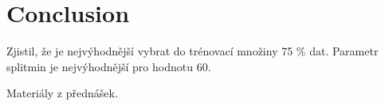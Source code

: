 \documentclass[journal]{IEEEtran}
\begin{document}
\section{Conclusion}
Zjistil, \v{z}e je nejv\'{y}hodn\v{e}j\v{s}\'{i} vybrat do tr\'{e}novac\'{i} mno\v{z}iny 75 \% dat. Parametr splitmin je nejv\'{y}hodn\v{e}j\v{s}\'{i} pro hodnotu 60.
\begin{literatura}{1}

Materi\'{a}ly z p\v{r}edn\'{a}\v{s}ek.

\end{literatura}
\end{document}
